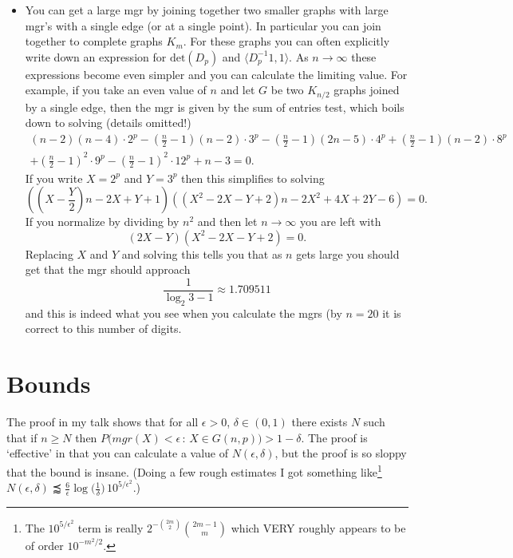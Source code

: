 \documentclass[12pt]{article}
\begin{document}
\begin{itemize}
\item You can get a large mgr by joining together two smaller graphs with large mgr's with a single edge (or at a single point). In particular you can join together to complete graphs $K_m$. For these graphs you can often explicitly write down an expression for $\mathrm{det}(D_p)$ and $\langle D_p^{-1} 1,1 \rangle$. As $n \to \infty$ these expressions become even simpler and you can calculate the limiting value. For example, if you take an even value of $n$ and let $G$ be two $K_{n/2}$ graphs joined by a single edge, then the mgr is given by the sum of entries test, which boils down to solving (details omitted!)
    \begin{multline*} (n-2)(n-4)\cdot 2^p-(\frac{n}{2}-1)(n-2)\cdot 3^p-(\frac{n}{2}-1)(2n-5)\cdot 4^p+(\frac{n}{2}-1)(n-2)\cdot 8^p \\
    +(\frac{n}{2}-1)^2\cdot9^p-(\frac{n}{2}-1)^2\cdot 12^p+n-3= 0.
    \end{multline*}
  If you write $X = 2^p$ and $Y = 3^p$ then this simplifies to solving
  \[ ((X-\frac{Y}{2})n-2X+Y+1)((X^2-2X-Y+2)n-2X^2+4X+2Y-6) = 0.\]
  If you normalize by dividing by $n^2$ and then let $n \to \infty$ you are left with
    \[ (2X-Y)(X^2-2X-Y+2) = 0.\]
  Replacing $X$ and $Y$ and solving this tells you that as $n$ gets large you should get that the mgr should approach
    \[ \frac{1}{\log_2{3}-1} \approx 1.709511\]
  and this is indeed what you see when you calculate the mgrs (by $n=20$ it is correct to this number of digits.

\end{itemize}

\vfill\eject

\section*{Bounds}

The proof in my talk shows that for all $\epsilon > 0$, $\delta \in (0,1)$ there exists $N$ such that if $n \ge N$ then $P\bigl(mgr(X) < \epsilon \,:\, X \in G(n,p)\bigr) > 1-\delta$. The proof is `effective' in that you can calculate a value of $N(\epsilon,\delta)$, but the proof is so sloppy that the bound is insane. (Doing a few rough estimates I got something like\footnote{The $10^{5/\epsilon^2}$ term is really $2^{-\binom{2m}{2}}\binom{2m-1}{m}$ which VERY roughly appears to be of order $10^{-m^2/2}$.} $N(\epsilon,\delta) \precapprox \frac{6}{\epsilon} \log\big( \frac{1}{\delta}\bigr)\, 10^{5/\epsilon^2}$.)
\end{document}
